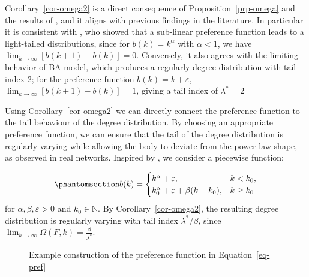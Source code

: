 \documentclass[
  sn-basic,
  10pt,
]{sn-jnl}
\theoremstyle{plain}
\theoremstyle{plain}
\theoremstyle{remark}
\begin{document}
Corollary~\ref{cor-omega2} is a direct consequence of
Proposition~\ref{prp-omega} and the results of \citet{shimura12}, and it
aligns with previous findings in the literature. In particular it is
consistent with \citet{krapivsky01}, who showed that a sub-linear
preference function leads to a light-tailed distributions, since for
\(b(k)=k^\alpha\) with \(\alpha<1\), we have
\(\lim_{k\rightarrow\infty}[b(k+1)-b(k)]=0\). Conversely, it also agrees
with the limiting behavior of BA model, which produces a regularly
degree distribution with tail index 2; for the preference function
\(b(k)=k+\varepsilon\), \(\lim_{k\rightarrow\infty}[b(k+1)-b(k)]=1\),
giving a tail index of \(\lambda^*=2\)

Using Corollary~\ref{cor-omega2} we can directly connect the preference
function to the tail behaviour of the degree distribution. By choosing
an appropriate preference function, we can ensure that the tail of the
degree distribution is regularly varying while allowing the body to
deviate from the power-law shape, as observed in real networks. Inspired
by \citet{Lee24}, we consider a piecewise function:

\begin{equation}\phantomsection\label{eq-pref}{
b(k) = \begin{cases}
k^\alpha + \varepsilon,&k<k_0,\\
k_0^\alpha + \varepsilon + \beta(k-k_0), &k\ge k_0
\end{cases}
}\end{equation} for \(\alpha,\beta, \varepsilon>0\) and
\(k_0\in\mathbb N\). By Corollary~\ref{cor-omega2}, the resulting degree
distribution is regularly varying with tail index \(\lambda^*/\beta\),
since
\(\lim_{k\rightarrow\infty}\Omega(F,k) = \frac{\beta}{\lambda^*}\).

\begin{figure}


\caption{\label{fig-ex}Example construction of the preference function
in Equation~\ref{eq-pref}}

\end{figure}%
\end{document}
